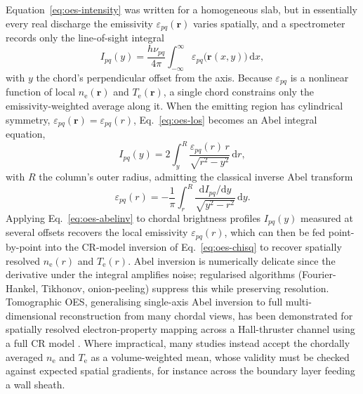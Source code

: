 Equation~\eqref{eq:oes-intensity} was written for a homogeneous slab, but in essentially every real discharge the emissivity $\varepsilon_{pq}(\mathbf{r})$ varies spatially, and a spectrometer records only the line-of-sight integral
\begin{equation}
I_{pq}(y) = \frac{h\nu_{pq}}{4\pi} \int_{-\infty}^{\infty} \varepsilon_{pq}\big(\mathbf{r}(x,y)\big)\, \mathrm{d}x,
\label{eq:oes-los}
\end{equation}
with $y$ the chord's perpendicular offset from the axis. Because $\varepsilon_{pq}$ is a nonlinear function of local $n_{\mathrm{e}}(\mathbf{r})$ and $T_{\mathrm{e}}(\mathbf{r})$, a single chord constrains only the emissivity-weighted average along it. When the emitting region has cylindrical symmetry, $\varepsilon_{pq}(\mathbf{r})=\varepsilon_{pq}(r)$, Eq.~\eqref{eq:oes-los} becomes an Abel integral equation,
\begin{equation}
I_{pq}(y) = 2\int_{y}^{R} \frac{\varepsilon_{pq}(r)\, r}{\sqrt{r^{2}-y^{2}}}\, \mathrm{d}r ,
\label{eq:oes-abel}
\end{equation}
with $R$ the column's outer radius, admitting the classical inverse Abel transform
\begin{equation}
\varepsilon_{pq}(r) = -\frac{1}{\pi}\int_{r}^{R} \frac{\mathrm{d}I_{pq}/\mathrm{d}y}{\sqrt{y^{2}-r^{2}}}\, \mathrm{d}y .
\label{eq:oes-abelinv}
\end{equation}
Applying Eq.~\eqref{eq:oes-abelinv} to chordal brightness profiles $I_{pq}(y)$ measured at several offsets recovers the local emissivity $\varepsilon_{pq}(r)$, which can then be fed point-by-point into the CR-model inversion of Eq.~\eqref{eq:oes-chisq} to recover spatially resolved $n_{\mathrm{e}}(r)$ and $T_{\mathrm{e}}(r)$. Abel inversion is numerically delicate since the derivative under the integral amplifies noise; regularised algorithms (Fourier-Hankel, Tikhonov, onion-peeling) suppress this while preserving resolution. Tomographic OES, generalising single-axis Abel inversion to full multi-dimensional reconstruction from many chordal views, has been demonstrated for spatially resolved electron-property mapping across a Hall-thruster channel using a full CR model \cite{ref0257}. Where impractical, many studies instead accept the chordally averaged $n_{\mathrm{e}}$ and $T_{\mathrm{e}}$ as a volume-weighted mean, whose validity must be checked against expected spatial gradients, for instance across the boundary layer feeding a wall sheath.

